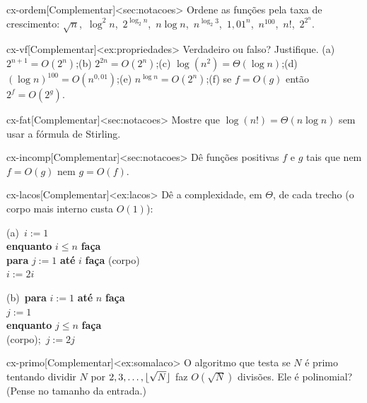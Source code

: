 \excompl
\begin{exercicio}{cx-ordem}[Complementar]<sec:notacoes>
Ordene as funções pela taxa de crescimento: $\sqrt n$,\ $\log^2 n$,\ $2^{\log_2 n}$,\ $n\log n$,\ $n^{\log_2 3}$,\ $1{,}01^n$,\ $n^{100}$,\ $n!$,\ $2^{2^n}$.
\end{exercicio}
\begin{exercicio}{cx-vf}[Complementar]<ex:propriedades>
Verdadeiro ou falso? Justifique.
(a) $2^{n+1}=O(2^n)$;\quad (b) $2^{2n}=O(2^n)$;\quad (c) $\log(n^2)=\Theta(\log n)$;\quad (d) $(\log n)^{100}=O(n^{0{,}01})$;\quad (e) $n^{\log n}=O(2^n)$;\quad (f) se $f=O(g)$ então $2^{f}=O(2^{g})$.
\end{exercicio}
\begin{exercicio}{cx-fat}[Complementar]<sec:notacoes>
Mostre que $\log(n!)=\Theta(n\log n)$ sem usar a fórmula de Stirling.
\end{exercicio}
\begin{exercicio}{cx-incomp}[Complementar]<sec:notacoes>
Dê funções positivas $f$ e $g$ tais que nem $f=O(g)$ nem $g=O(f)$.
\end{exercicio}
\begin{exercicio}{cx-lacos}[Complementar]<ex:lacos>
Dê a complexidade, em $\Theta$, de cada trecho (o corpo mais interno custa $O(1)$):
\begin{center}\small
\begin{minipage}{0.45\linewidth}
(a)\ $i:=1$\\
\textbf{enquanto} $i\le n$ \textbf{faça}\\
\hspace*{1em}\textbf{para} $j:=1$ \textbf{até} $i$ \textbf{faça} (corpo)\\
\hspace*{1em}$i:=2i$
\end{minipage}
\begin{minipage}{0.45\linewidth}
(b)\ \textbf{para} $i:=1$ \textbf{até} $n$ \textbf{faça}\\
\hspace*{1em}$j:=1$\\
\hspace*{1em}\textbf{enquanto} $j\le n$ \textbf{faça}\\
\hspace*{2em}(corpo);\ $j:=2j$
\end{minipage}
\end{center}
\end{exercicio}
\begin{exercicio}{cx-primo}[Complementar]<ex:somalaco>
O algoritmo que testa se $N$ é primo tentando dividir $N$ por $2,3,\dots,\lfloor\sqrt N\rfloor$ faz $O(\sqrt N)$ divisões. Ele é polinomial? (Pense no tamanho da entrada.)
\end{exercicio}
